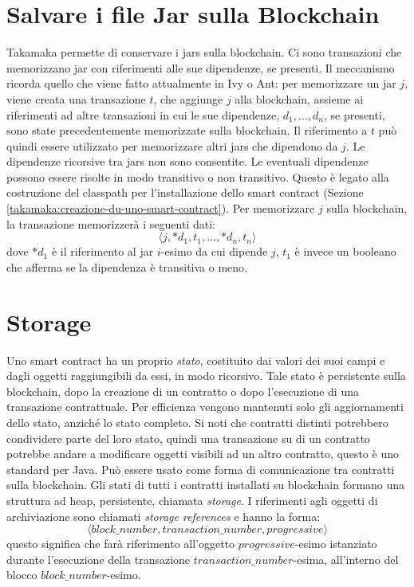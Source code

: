 \section{Salvare i file Jar sulla Blockchain} \label{takamaka:salvare-i-file-jar-sulla-blockchain}
Takamaka permette di conservare i jars sulla blockchain. Ci sono transazioni che memorizzano jar con riferimenti alle sue dipendenze, se presenti. Il meccanismo ricorda quello che viene fatto attualmente in Ivy o Ant: per memorizzare un jar $j$, viene creata una transazione $t$, che aggiunge $j$ alla blockchain, assieme ai riferimenti ad altre transazioni in cui le sue dipendenze, $d_1, \dots, d_n$, se presenti, sono state precedentemente memorizzate sulla blockchain. Il riferimento a $t$ può quindi essere utilizzato per memorizzare altri jars che dipendono da $j$. Le dipendenze ricorsive tra jars non sono consentite. Le eventuali dipendenze possono essere risolte in modo transitivo o non transitivo. Questo è legato alla costruzione del classpath per l'installazione dello smart contract (Sezione \ref{takamaka:creazione-du-uno-smart-contract}). Per memorizzare $j$ sulla blockchain, la transazione memorizzerà i seguenti dati:
%
\[\langle j, *d_1, t_1, \dots, *d_n, t_n \rangle\]
%
dove $*d_1$ è il riferimento al jar $i$-esimo da cui dipende $j$, $t_1$ è invece un booleano che afferma se la dipendenza è transitiva o meno. 

\section{Storage} \label{takamaka:storage}
Uno smart contract ha un proprio \textit{stato}, costituito dai valori dei suoi campi e dagli oggetti raggiungibili da essi, in modo ricorsivo. Tale stato è persistente sulla blockchain, dopo la creazione di un contratto o dopo l'esecuzione di una transazione contrattuale. Per efficienza vengono mantenuti solo gli aggiornamenti dello stato, anziché lo stato completo. Si noti che contratti distinti potrebbero condividere parte del loro stato, quindi una transazione su di un contratto potrebbe andare a modificare oggetti visibili ad un altro contratto, questo è uno standard per Java. Può essere usato come forma di comunicazione tra contratti sulla blockchain. Gli stati di tutti i contratti installati su blockchain formano una struttura ad heap, persistente, chiamata \textit{storage}. I riferimenti agli oggetti di archiviazione sono chiamati \textit{storage references} e hanno la forma:
%
\[\langle block\_number, \mathit{transaction \_number}, \mathit{progressive} \rangle \]
%
questo significa che farà riferimento all'oggetto $progressive$-esimo istanziato durante l'esecuzione della transazione $transaction\_number$-esima, all'interno del blocco $block\_number$-esimo.

